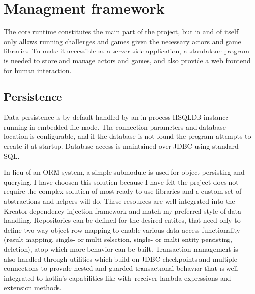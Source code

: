 





%

\chapter{Managment framework}\label{sect:Web}

The core runtime constitutes the main part of the project, but in and of itself only allows running challenges and games given the necessary actors and game libraries. To make it accessible as a server side application, a standalone program is needed to store and manage actors and games, and also provide a web frontend for human interaction.

	\section{Persistence}
	
	Data persistence is by default handled by an in-process HSQLDB instance running in embedded file mode. The connection parameters and database location is configurable, and if the database is not found the program attempts to create it at startup. Database access is maintained over JDBC using standard SQL.
		
	In lieu of an ORM system, a simple submodule is used for object persisting and querying. I have choosen this solution because I have felt the project does not require the complex solution of most ready-to-use libraries and a custom set of abstractions and helpers will do. These resources are well integrated into the Kreator dependency injection framework and match my preferred style of data handling. Repositories can be defined for the desired entites, that need only to define two-way object-row mapping to enable various data access functionality (result mapping, single- or multi selection, single- or multi entity persisting, deletion), atop which more behavior can be built. Transaction management is also handled through utilities which build on JDBC checkpoints and multiple connections to provide nested and guarded transactional behavior that is well-integrated to kotlin's capabilities like with--receiver lambda expressions and extension methods.

